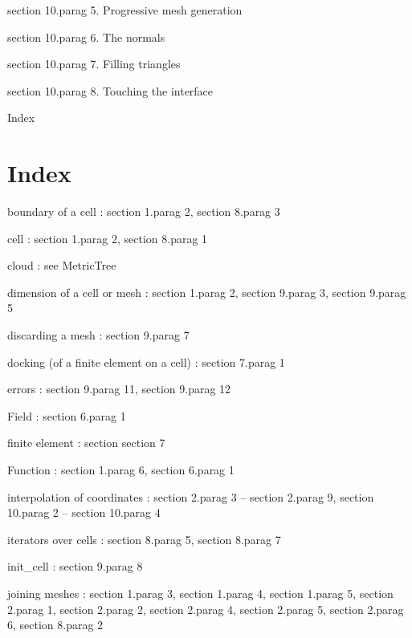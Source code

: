 \numb section 10.\numb parag 5. Progressive mesh generation

\numb section 10.\numb parag 6. The normals

\numb section 10.\numb parag 7. Filling triangles

\numb section 10.\numb parag 8. Touching the interface

\medskip\noindent
Index
















\section{Index}

boundary of a cell : \numb section 1.\numb parag 2, \numb section 8.\numb parag 3

cell : \numb section 1.\numb parag 2, \numb section 8.\numb parag 1

cloud : see {\codett MetricTree}

dimension of a cell or mesh : \numb section 1.\numb parag 2, \numb section 9.\numb parag 3,
\numb section 9.\numb parag 5

discarding a mesh : \numb section 9.\numb parag 7

docking (of a finite element on a cell) : \numb section 7.\numb parag 1

errors : \numb section 9.\numb parag 11, \numb section 9.\numb parag 12

{\codett Field} : \numb section 6.\numb parag 1

finite element : section \numb section 7

{\codett Function} : \numb section 1.\numb parag 6, \numb section 6.\numb parag 1

interpolation of coordinates : \numb section 2.\numb parag 3 -- \numb section 2.\numb parag 9,
\numb section 10.\numb parag 2 -- \numb section 10.\numb parag 4

iterators over cells : \numb section 8.\numb parag 5, \numb section 8.\numb parag 7

{\codett init\_cell} : \numb section 9.\numb parag 8

{\codett join}ing meshes : \numb section 1.\numb parag 3, \numb section 1.\numb parag 4,
\numb section 1.\numb parag 5, \numb section 2.\numb parag 1, \numb section 2.\numb parag 2,
\numb section 2.\numb parag 4, \numb section 2.\numb parag 5, \numb section 2.\numb parag 6,
\numb section 8.\numb parag 2

